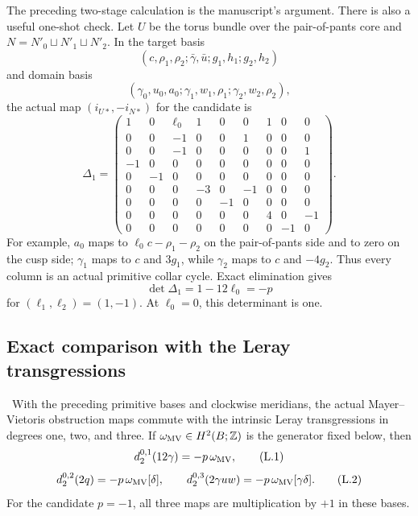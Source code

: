 \begin{remark}
The preceding two-stage calculation is the manuscript's argument.  There is
also a useful one-shot check.  Let $U$ be the torus bundle over the
pair-of-pants core and
$N=N'_0\sqcup N'_1\sqcup N'_2$.  In the target basis
\[
(c,\rho_1,\rho_2;
 \bar\gamma,\bar u;
 g_1,h_1;g_2,h_2)
\]
and domain basis
\[
(\gamma_0,u_0,a_0;
 \gamma_1,w_1,\rho_1;
 \gamma_2,w_2,\rho_2),
\]
the actual map $(i_{U*},-i_{N*})$ for the candidate is
\[
\Delta_1=
\begin{pmatrix}
1&0&\ell_0&1&0&0&1&0&0\\
0&0&-1&0&0&1&0&0&0\\
0&0&-1&0&0&0&0&0&1\\
-1&0&0&0&0&0&0&0&0\\
0&-1&0&0&0&0&0&0&0\\
0&0&0&-3&0&-1&0&0&0\\
0&0&0&0&-1&0&0&0&0\\
0&0&0&0&0&0&4&0&-1\\
0&0&0&0&0&0&0&-1&0
\end{pmatrix}.
\tag{MV.17}
\]
For example, $a_0$ maps to
$\ell_0c-\rho_1-\rho_2$ on the pair-of-pants side and to zero on the cusp
side; $\gamma_1$ maps to $c$ and $3g_1$, while $\gamma_2$ maps to $c$ and
$-4g_2$.  Thus every column is an actual primitive collar cycle.  Exact
elimination gives
\[
 \det\Delta_1=1-12\ell_0=-p
\]
for $(\ell_1,\ell_2)=(1,-1)$.  At $\ell_0=0$, this determinant is one.
\end{remark}

\subsection{Exact comparison with the Leray transgressions}

\begin{theorem}
\label{thm:mv-leray-comparison}
\Verified\ With the preceding primitive bases and clockwise meridians, the
actual Mayer--Vietoris obstruction maps commute with the intrinsic Leray
transgressions in degrees one, two, and three.  If
$\omega_{\rm MV}\in H^2(B;\mathbb Z)$ is the generator fixed below, then
\[
 d_2^{0,1}(12\gamma)=-p\,\omega_{\rm MV},
\tag{L.1}
\]
\[
 d_2^{0,2}(2q)=-p\,\omega_{\rm MV}[\delta],
 \qquad
 d_2^{0,3}(2\gamma uw)
   =-p\,\omega_{\rm MV}[\gamma\delta].
\tag{L.2}
\]
For the candidate $p=-1$, all three maps are multiplication by $+1$ in
these bases.
\end{theorem}

